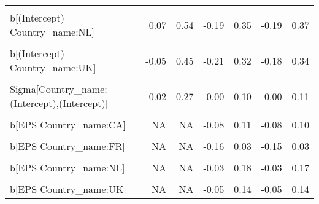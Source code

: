 \begin{table}
\begin{tabular}[t]{lrrrrrr}
\cellcolor{gray!10}{b[(Intercept) Country\_name:IL]} & \cellcolor{gray!10}{-0.55} & \cellcolor{gray!10}{0.47} & \cellcolor{gray!10}{-0.30} & \cellcolor{gray!10}{0.27} & \cellcolor{gray!10}{-0.27} & \cellcolor{gray!10}{0.28}\\
b[(Intercept) Country\_name:NL] & 0.07 & 0.54 & -0.19 & 0.35 & -0.19 & 0.37\\
\cellcolor{gray!10}{b[(Intercept) Country\_name:SE]} & \cellcolor{gray!10}{-0.49} & \cellcolor{gray!10}{0.01} & \cellcolor{gray!10}{-0.34} & \cellcolor{gray!10}{0.19} & \cellcolor{gray!10}{-0.32} & \cellcolor{gray!10}{0.20}\\
b[(Intercept) Country\_name:UK] & -0.05 & 0.45 & -0.21 & 0.32 & -0.18 & 0.34\\
\cellcolor{gray!10}{b[(Intercept) Country\_name:US]} & \cellcolor{gray!10}{-0.29} & \cellcolor{gray!10}{0.20} & \cellcolor{gray!10}{-0.23} & \cellcolor{gray!10}{0.21} & \cellcolor{gray!10}{-0.25} & \cellcolor{gray!10}{0.20}\\
Sigma[Country\_name:(Intercept),(Intercept)] & 0.02 & 0.27 & 0.00 & 0.10 & 0.00 & 0.11\\
\cellcolor{gray!10}{b[EPS Country\_name:BE]} & \cellcolor{gray!10}{NA} & \cellcolor{gray!10}{NA} & \cellcolor{gray!10}{-0.13} & \cellcolor{gray!10}{0.06} & \cellcolor{gray!10}{-0.13} & \cellcolor{gray!10}{0.05}\\
b[EPS Country\_name:CA] & NA & NA & -0.08 & 0.11 & -0.08 & 0.10\\
\cellcolor{gray!10}{b[EPS Country\_name:CH]} & \cellcolor{gray!10}{NA} & \cellcolor{gray!10}{NA} & \cellcolor{gray!10}{-0.05} & \cellcolor{gray!10}{0.14} & \cellcolor{gray!10}{-0.04} & \cellcolor{gray!10}{0.14}\\
b[EPS Country\_name:FR] & NA & NA & -0.16 & 0.03 & -0.15 & 0.03\\
\cellcolor{gray!10}{b[EPS Country\_name:IL]} & \cellcolor{gray!10}{NA} & \cellcolor{gray!10}{NA} & \cellcolor{gray!10}{-0.17} & \cellcolor{gray!10}{0.17} & \cellcolor{gray!10}{-0.17} & \cellcolor{gray!10}{0.15}\\
b[EPS Country\_name:NL] & NA & NA & -0.03 & 0.18 & -0.03 & 0.17\\
\cellcolor{gray!10}{b[EPS Country\_name:SE]} & \cellcolor{gray!10}{NA} & \cellcolor{gray!10}{NA} & \cellcolor{gray!10}{-0.16} & \cellcolor{gray!10}{0.04} & \cellcolor{gray!10}{-0.15} & \cellcolor{gray!10}{0.03}\\
b[EPS Country\_name:UK] & NA & NA & -0.05 & 0.14 & -0.05 & 0.14\\

\end{tabular}
\end{table}

